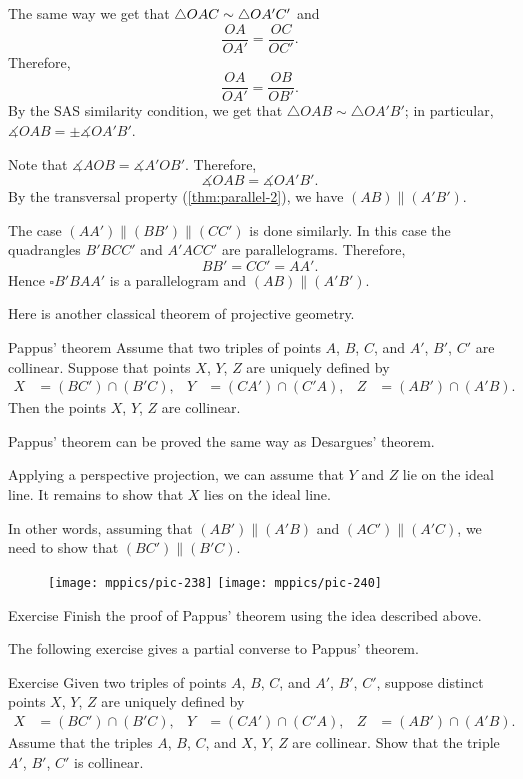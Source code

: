 The same way we get that $\triangle OAC\z\sim\triangle OA'C'$ and
\[\frac{OA}{OA'}=\frac{OC}{OC'}.\]
Therefore, 
\[\frac{OA}{OA'}=\frac{OB}{OB'}.\]
By the SAS similarity condition, 
we get that $\triangle OAB\sim\triangle OA'B'$;
in particular, $\measuredangle OAB=\pm\measuredangle OA'B'$.

Note that $\measuredangle AOB=\measuredangle A'OB'$.
Therefore, 
\[\measuredangle OAB=\measuredangle OA'B'.\]
By the transversal property (\ref{thm:parallel-2}), we have
$(AB)\parallel (A'B')$.

The case $(AA')\parallel(BB')\parallel(CC')$ is done similarly.
In this case the quadrangles $B'BCC'$ and $A'ACC'$ are parallelograms.
Therefore, 
\[BB'=CC'=AA'.\]
Hence $\square B'BAA'$ is a parallelogram and $(AB)\parallel (A'B')$.
\qeds

Here is another classical theorem of projective geometry.

\begin{thm}{Pappus' theorem}\label{thm:pappus}
Assume that two triples of points $A$, $B$, $C$,
and $A'$, $B'$, $C'$ are collinear.
Suppose that points $X$, $Y$, $Z$ are uniquely defined by
\begin{align*}
X&=(BC')\cap(B'C),
&
Y&=(CA')\cap(C'A),
&
Z&=(AB')\cap(A'B).
\end{align*}
Then the points $X$, $Y$, $Z$ are collinear.
\end{thm}

Pappus' theorem can be proved the same way as Desargues' theorem.

Applying a perspective projection, we can assume that $Y$ and $Z$ lie on the ideal line.
It remains to show that $X$ lies on the ideal line.

In other words, assuming that $(AB')\parallel (A'B)$ and $(AC')\parallel (A'C)$, we need to show that $(BC')\parallel(B'C)$.

\begin{figure}[h!]
\centering
\texttt{[image: mppics/pic-238]}
\hskip15mm
\texttt{[image: mppics/pic-240]}
\end{figure}


\begin{thm}{Exercise}\label{ex:pappus}
Finish the proof of Pappus' theorem using the idea described above.
\end{thm}

The following exercise gives a partial converse to Pappus' theorem.

\begin{thm}{Exercise}\label{ex:pappus-converse}
Given two triples of points $A$, $B$, $C$,
and $A'$, $B'$, $C'$,
suppose distinct points $X$, $Y$, $Z$ are uniquely defined by
\begin{align*}
X&=(BC')\cap(B'C),
&
Y&=(CA')\cap(C'A),
&
Z&=(AB')\cap(A'B).
\end{align*}
Assume that the triples $A$, $B$, $C$,
and $X$, $Y$, $Z$ are collinear.
Show that the triple $A'$, $B'$, $C'$ is collinear.
\end{thm}

